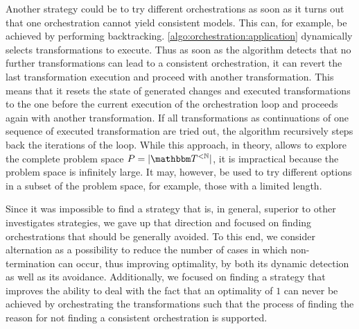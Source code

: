 Another strategy could be to try different orchestrations as soon as it turns out that one orchestration cannot yield consistent models.
This can, for example, be achieved by performing backtracking.
\autoref{algo:orchestration:application} dynamically selects transformations to execute. 
Thus as soon as the algorithm detects that no further transformations can lead to a consistent orchestration, it can revert the last transformation execution and proceed with another transformation.
This means that it resets the state of generated changes and executed transformations to the one before the current execution of the orchestration loop and proceeds again with another transformation.
If all transformations as continuations of one sequence of executed transformation are tried out, the algorithm recursively steps back the iterations of the loop.
While this approach, in theory, allows to explore the complete problem space $P = \abs{\transformationset{T}^{< \mathbb{N}}}$, it is impractical because the problem space is infinitely large.
It may, however, be used to try different options in a subset of the problem space, for example, those with a limited length.


Since it was impossible to find a strategy that is, in general, superior to other investigates strategies, we gave up that direction and focused on finding orchestrations that should be generally avoided.
To this end, we consider alternation as a possibility to reduce the number of cases in which non-termination can occur, thus improving optimality, by both its dynamic detection as well as its avoidance.
Additionally, we focused on finding a strategy that improves the ability to deal with the fact that an optimality of $1$ can never be achieved by orchestrating the transformations such that the process of finding the reason for not finding a consistent orchestration is supported.


